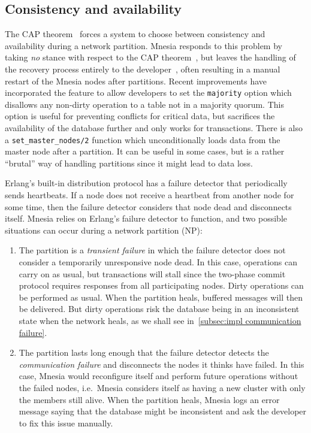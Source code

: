\subsection{Consistency and availability} \label{subsec:bg cap}

The CAP theorem~\cite{gilbert2012cap} forces a system to choose between consistency
and availability during a network partition. Mnesia responds to this problem by 
taking \emph{no} stance with respect to the CAP theorem~\cite{andersen2014mnesiacap},
but leaves the handling of the recovery process entirely 
to the developer~\cite{ericssonab2023mnesiaguide}, often resulting in a manual restart
of the Mnesia nodes after partitions. Recent improvements have incorporated
the feature to allow developers to set the \texttt{majority} option which disallows 
any non-dirty operation to a table not in a majority quorum. This option
is useful for preventing conflicts for critical data, but sacrifices the availability
of the database further and only works for transactions. There is also a
\verb|set_master_nodes/2| function which unconditionally loads data from the master node
after a partition. It can be useful in some cases, but is a rather ``brutal''
way of handling partitions since it might lead to data loss.

Erlang's built-in distribution protocol has a failure detector that periodically 
sends heartbeats. If a node does not receive a heartbeat from
another node for some time, then the failure detector considers that node dead
and disconnects itself. Mnesia relies on Erlang's failure detector to function,
and two possible situations can occur during a network partition (NP):

\begin{enumerate}[label={NP\arabic*.},ref={NP\arabic*}]
  \item The partition is a \emph{transient failure} in which the failure 
  detector does not consider
  a temporarily unresponsive node dead. In this case, operations can carry on
  as usual, but transactions will stall since the two-phase commit protocol requires
  responses from all participating nodes. Dirty operations can be performed as usual.
  When the partition heals, buffered messages will then be delivered.
  But dirty operations risk the database being in an inconsistent 
  state when the network heals, as we shall see in~\cref{subsec:impl communication failure}.
  \label{itm:transient partition}
  \item The partition lasts long enough that the failure detector detects the
  \emph{communication failure} and disconnects the nodes it thinks have failed. 
  In this case, Mnesia would 
  reconfigure itself and perform future operations without the failed nodes, i.e.\ Mnesia considers
  itself as having a new cluster with only the members still alive. 
  When the partition heals, Mnesia
  logs an error message saying that the database might be inconsistent
  and ask the developer to fix this issue manually. \label{itm:comm failure}
\end{enumerate}



